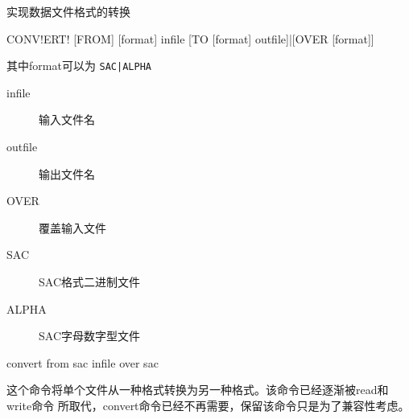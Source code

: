 \label{cmd:convert}

实现数据文件格式的转换

\begin{SACSTX}
CONV!ERT! [FROM] [format] infile [TO [format] outfile]|[OVER [format]]
\end{SACSTX}
其中format可以为 \texttt{SAC|ALPHA}

\begin{description}
\item [infile] 输入文件名
\item [outfile] 输出文件名
\item [OVER] 覆盖输入文件
\item [SAC] SAC格式二进制文件
\item [ALPHA] SAC字母数字型文件
\end{description}

\begin{SACDFT}
convert from sac infile over sac
\end{SACDFT}

这个命令将单个文件从一种格式转换为另一种格式。该命令已经逐渐被read和write命令
所取代，convert命令已经不再需要，保留该命令只是为了兼容性考虑。
